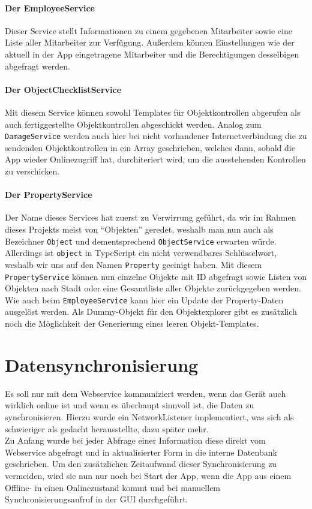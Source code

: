 \documentclass[12pt]{article}
\begin{document}
\paragraph{Der EmployeeService} Dieser Service stellt Informationen zu einem gegebenen Mitarbeiter sowie eine Liste aller Mitarbeiter zur Verfügung. Außerdem können Einstellungen wie der aktuell in der App eingetragene Mitarbeiter und die Berechtigungen desselbigen abgefragt werden.
\paragraph{Der ObjectChecklistService} Mit diesem Service können sowohl Templates für Objektkontrollen abgerufen als auch fertiggestellte Objektkontrollen abgeschickt werden. Analog zum \texttt{DamageService} werden auch hier bei nicht vorhandener Internetverbindung die zu sendenden Objektkontrollen in ein Array geschrieben, welches dann, sobald die App wieder Onlinezugriff hat, durchiteriert wird, um die ausstehenden Kontrollen zu verschicken.
\paragraph{Der PropertyService} Der Name dieses Services hat zuerst zu Verwirrung geführt, da wir im Rahmen dieses Projekts meist von ``Objekten'' geredet, weshalb man nun auch als Bezeichner \texttt{Object} und dementsprechend \texttt{ObjectService} erwarten würde. Allerdings ist \texttt{object} in TypeScript ein nicht verwendbares Schlüsselwort, weshalb wir uns auf den Namen \texttt{Property} geeinigt haben. Mit diesem \texttt{PropertyService} können nun einzelne Objekte mit ID abgefragt sowie Listen von Objekten nach Stadt oder eine Gesamtliste aller Objekte zurückgegeben werden. Wie auch beim \texttt{EmployeeService} kann hier ein Update der Property-Daten ausgelöst werden. Als Dummy-Objekt für den Objektexplorer gibt es zusätzlich noch die Möglichkeit der Generierung eines leeren Objekt-Templates.

\section{Datensynchronisierung}
Es soll nur mit dem Webservice kommuniziert werden, wenn das Gerät auch wirklich online ist und wenn es überhaupt sinnvoll ist, die Daten zu synchronisieren. Hierzu wurde ein NetworkListener implementiert, was sich als schwieriger als gedacht herausstellte, dazu später mehr.\\
Zu Anfang wurde bei jeder Abfrage einer Information diese direkt vom Webservice abgefragt und in aktualisierter Form in die interne Datenbank geschrieben. Um den zusätzlichen Zeitaufwand dieser Synchronisierung zu vermeiden, wird sie nun nur noch bei Start der App, wenn die App aus einem Offline- in einen Onlinezustand kommt und bei manuellem Synchronisierungsaufruf in der GUI durchgeführt. 
\end{document}
